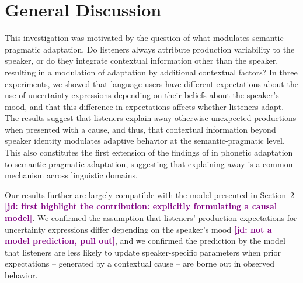 \documentclass[man,floatsintext]{apa6}
\newcommand{\jd}[1]{\textcolor{Purple}{\bf [jd: #1]}}
\begin{document}

\section{General Discussion}

This investigation was motivated by the question of what modulates semantic-pragmatic adaptation. %
Do listeners always attribute production variability to the speaker, or do they integrate contextual information other than the speaker, resulting in a modulation of adaptation by additional contextual factors? In three experiments, we showed that language users have different expectations about the use of uncertainty expressions depending on their beliefs about the speaker's mood, and that this difference in expectations affects whether listeners adapt. The results suggest that listeners explain away otherwise unexpected productions when presented with a cause, and thus, that  contextual information beyond speaker identity modulates adaptive behavior at the semantic-pragmatic level. This also constitutes the first extension of the findings of  in phonetic adaptation to semantic-pragmatic adaptation, suggesting that explaining away is a common mechanism across linguistic domains.

Our results further are largely compatible with the model presented in Section~2 \jd{first highlight the contribution: explicitly formulating a causal model}. We confirmed the assumption that listeners' production expectations for uncertainty expressions differ depending on the speaker's mood \jd{not a model prediction, pull out}, and we confirmed the prediction by the model that listeners are less likely to update speaker-specific parameters when prior expectations -- generated by a contextual cause -- are borne out in observed behavior. 
\end{document}
